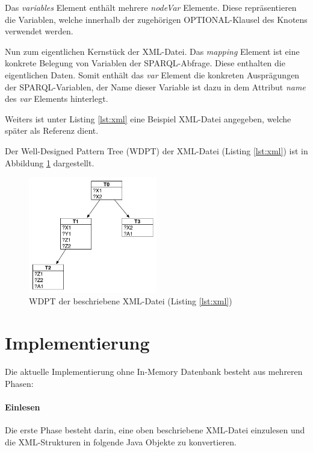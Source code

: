\documentclass[draft,final]{vutinfth} %
\begin{document}
Das \textit{variables} Element enthält mehrere \textit{nodeVar} Elemente. Diese repräsentieren die Variablen, welche innerhalb der zugehörigen OPTIONAL-Klausel des Knotens verwendet werden.

Nun zum eigentlichen Kernstück der XML-Datei. Das \textit{mapping} Element ist eine konkrete Belegung von Variablen der SPARQL-Abfrage. Diese enthalten die eigentlichen Daten. Somit enthält das \textit{var} Element die konkreten Ausprägungen der SPARQL-Variablen, der Name dieser Variable ist dazu in dem Attribut \textit{name} des \textit{var} Elements hinterlegt.\\

\pagebreak


Weiters ist unter Listing \ref{lst:xml} eine Beispiel XML-Datei angegeben, welche später als Referenz dient.


Der Well-Designed Pattern Tree (WDPT) der XML-Datei (Listing \ref{lst:xml}) ist in Abbildung \ref{wdptBsp} dargestellt.
\begin{figure}[ht]
	\centering
	\includegraphics[width=0.5\textwidth]{WDPT}
	\caption{WDPT der beschriebene XML-Datei (Listing \ref{lst:xml})}
	\label{wdptBsp}
\end{figure}

\section{Implementierung} \label{istImp}

Die aktuelle Implementierung ohne In-Memory Datenbank besteht aus mehreren Phasen:

\paragraph{Einlesen}
Die erste Phase besteht darin, eine oben beschriebene XML-Datei einzulesen und die XML-Strukturen in folgende Java Objekte zu konvertieren.
\end{document}
